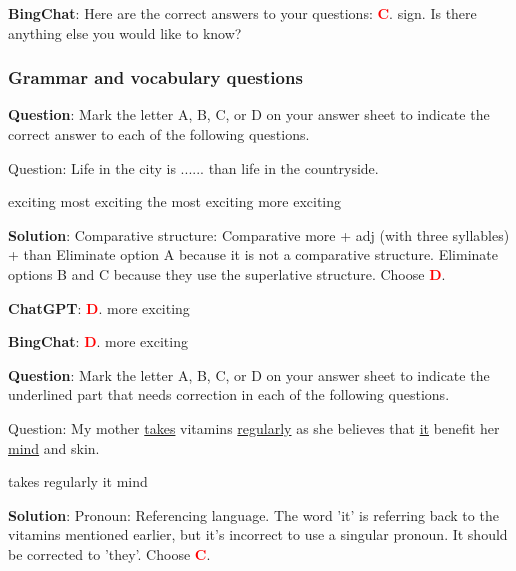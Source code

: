 \documentclass{article}
\begin{document}
{\begin{mdframed}[linewidth=1pt,linecolor=red]
		\textbf{BingChat}: Here are the correct answers to your questions: \textcolor{red}{\textbf{C}}. sign. Is there anything else you would like to know?
		
	\end{mdframed}
	
	\subsubsection{Grammar and vocabulary questions}
	\label{VNHSGE_Eng_G}
	\begin{mdframed}[linewidth=1pt,linecolor=red] \textbf{Question}: Mark the letter A, B, C, or D on your answer sheet to indicate the correct answer to each of the following questions. 
		
		Question: Life in the city is ...... than life in the countryside.
		
		\begin{oneparchoices}
			\choice exciting
			\choice most exciting
			\choice the most exciting
			\choice more exciting
		\end{oneparchoices}
		
		\textbf{Solution}: Comparative structure: Comparative more + adj (with three syllables) + than 
		Eliminate option A because it is not a comparative structure. Eliminate options B and C because they use the superlative structure. Choose \textcolor{red}{\textbf{D}}. 
		
		\textbf{ChatGPT}: \textcolor{red}{\textbf{D}}. more exciting 
		
		\textbf{BingChat}: \textcolor{red}{\textbf{D}}. more exciting
		
	\end{mdframed}
	
	\begin{mdframed}[linewidth=1pt,linecolor=red] \textbf{Question}: Mark the letter A, B, C, or D on your answer sheet to indicate the underlined part that needs correction in each of the following questions.
		
		Question: My mother \underline{takes} vitamins \underline{regularly} as she believes that \underline{it} benefit her \underline{mind} and skin.
		
		\begin{oneparchoices}
			\choice takes
			\choice regularly
			\choice it
			\choice mind
		\end{oneparchoices}
		
		\textbf{Solution}: Pronoun: Referencing language. The word 'it' is referring back to the vitamins mentioned earlier, but it's incorrect to use a singular pronoun. It should be corrected to 'they'. Choose \textcolor{red}{\textbf{C}}. 
		

\end{mdframed}}
\end{document}
